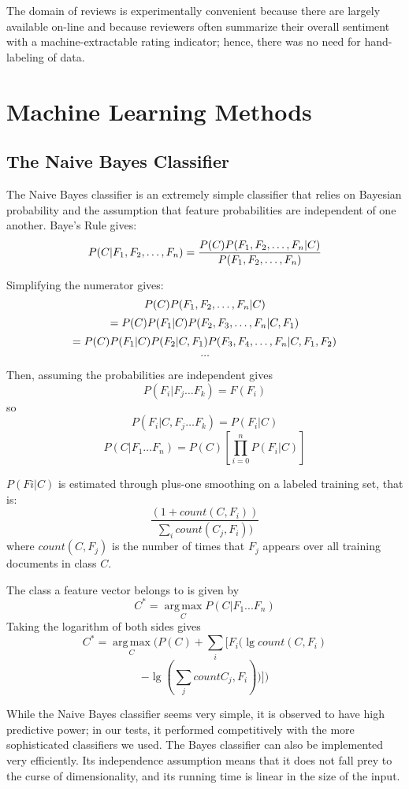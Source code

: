 \documentclass[10pt,twocolumn,letterpaper]{article}
\begin{document}
The domain of reviews is experimentally convenient because there are largely available on-line and because reviewers often summarize their overall sentiment with a machine-extractable rating indicator; hence, there was no need for hand-labeling of data.


\section{Machine Learning Methods}
\subsection{The Naive Bayes Classifier}
The Naive Bayes classifier is an extremely simple classifier that relies on Bayesian probability and the assumption that feature probabilities are independent of one another.
Baye's Rule gives:
$$
P(C | F_1, F_2, \ldots, F_n)
= \frac{P(C)P(F_1, F_2, \ldots, F_n | C)}{P(F_1, F_2, \ldots, F_n)} \\
$$

Simplifying the numerator gives:
$$P(C)P(F_1, F_2, \ldots, F_n | C)\\$$
$$= P(C)P(F_1 | C)P( F_2, F_3, \ldots, F_n| C, F_1) \\$$
$$= P(C)P(F_1 | C)P(F_2 | C, F_1)P(F_3, F_4, \ldots, F_n | C, F_1, F_2) \\$$
$$\ldots$$

Then, assuming the probabilities are independent gives
$$P(F_i | F_j\ldots F_k) = F(F_i)$$
so 
$$P(F_i | C, F_j\ldots F_k) = P(F_i | C)$$
$$P(C | F_1\ldots F_n) = P(C) [\prod_{i=0}^n P(F_i | C) ]$$

$P(Fi | C)$ is estimated through plus-one smoothing on a labeled training set, that is:
$$\frac{(1+count(C, F_i))}{\sum_i count(C_j, F_i))}$$
where $count(C, F_j)$ is the number of times that $F_j$ appears over all training documents in class $C$.

The class a feature vector belongs to is given by
$$C^* = \operatorname*{arg\,max}_C P(C | F_1...F_n)$$
Taking the logarithm of both sides gives
$$C^* = \operatorname*{arg\,max}_C (P(C) + \sum_i [F_i (\lg count (C, F_i)$$ 
$$ - \lg (\sum_j count C_j, F_i))])$$

While the Naive Bayes classifier seems very simple, it is observed to have high predictive power; in our tests, it performed competitively with the more sophisticated classifiers we used. The Bayes classifier can also be implemented very efficiently. Its independence assumption means that it does not fall prey to the curse of dimensionality, and its running time is linear in the size of the input.
\end{document}
